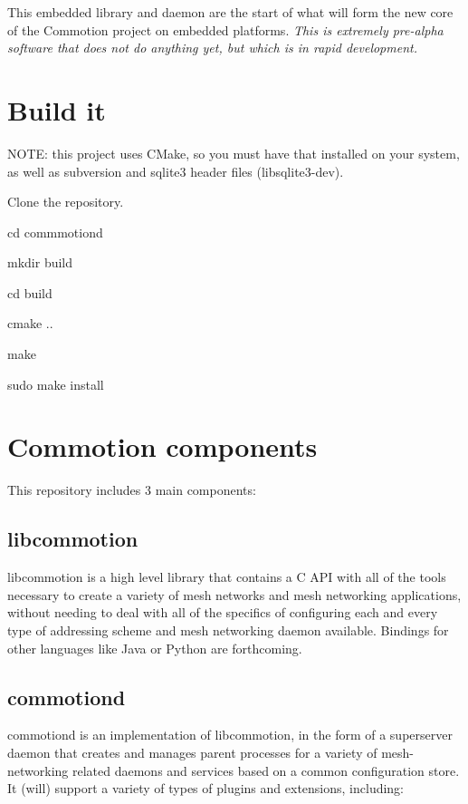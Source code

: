 This embedded library and daemon are the start of what will form the new core of the Commotion project on embedded platforms. {\itshape This is extremely pre-\/alpha software that does not do anything yet, but which is in rapid development.}

\section*{Build it }

N\+O\+T\+E\+: this project uses C\+Make, so you must have that installed on your system, as well as subversion and sqlite3 header files (libsqlite3-\/dev).


\begin{DoxyEnumerate}
\item Clone the repository.
\item cd commmotiond
\item mkdir build
\item cd build
\item cmake ..
\item make
\item sudo make install
\end{DoxyEnumerate}

\section*{Commotion components }

This repository includes 3 main components\+:

\subsection*{libcommotion }

libcommotion is a high level library that contains a C A\+P\+I with all of the tools necessary to create a variety of mesh networks and mesh networking applications, without needing to deal with all of the specifics of configuring each and every type of addressing scheme and mesh networking daemon available. Bindings for other languages like Java or Python are forthcoming.

\subsection*{commotiond }

commotiond is an implementation of libcommotion, in the form of a superserver daemon that creates and manages parent processes for a variety of mesh-\/networking related daemons and services based on a common configuration store. It (will) support a variety of types of plugins and extensions, including\+:


